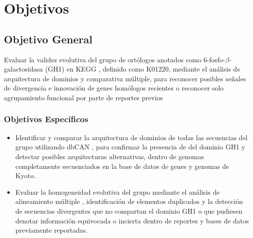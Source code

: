 \section{Objetivos}

\subsection{Objetivo General}
Evaluar la validez evolutiva del grupo de ortólogos anotados como 6-fosfo-$\beta$-galactosidasa (GH1) en KEGG \parencite{Kanehisa_2004}, definido como K01220, mediante el análisis de arquitectura de dominios y comparativa múltiple, para reconocer posibles señales de divergencia e innovación de genes homólogos recientes o reconocer solo agrupamiento funcional por parte de reportes previos

\subsubsection{Objetivos Específicos}
\begin{itemize}
	\item  Identificar y comparar la arquitectura de dominios de todas las secuencias del grupo utilizando dbCAN \parencite{Huang_2017, Zhang_2018}, para confirmar la presencia de del dominio GH1 y detectar posibles arquitecturas alternativas, dentro de genomas completamente secuenciados en la base de datos de genes y genomas de Kyoto.   
	\item Evaluar la homogeneidad evolutiva del grupo mediante el análisis de alineamiento múltiple \parencite{Edgar_2004, Tamura_2021}, identificación de elementos duplicados y la detección de secuencias divergentes que no compartan el dominio GH1 o que pudiesen denotar información equivocada o incierta dentro de reportes y bases de datos previamente reportadas.	
	\end{itemize}  

\clearpage